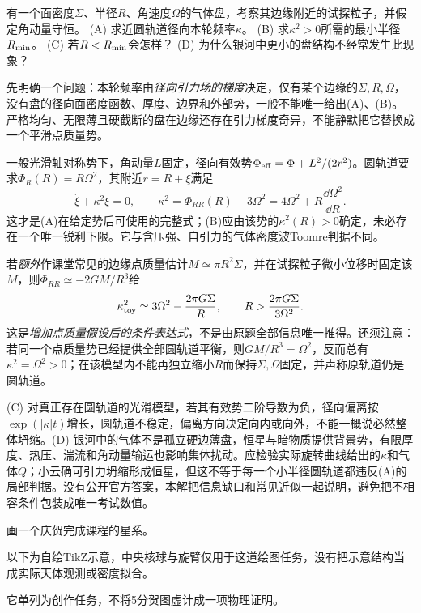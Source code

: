 \begin{exercise}
有一个面密度$\Sigma$、半径$R$、角速度$\Omega$的气体盘，考察其边缘附近的试探粒子，并假定角动量守恒。
(A) 求近圆轨道径向本轮频率$\kappa$。
(B) 求$\kappa^2>0$所需的最小半径$R_{ \rm min}$。
(C) 若$R<R_{ \rm min}$会怎样？
(D) 为什么银河中更小的盘结构不经常发生此现象？
\end{exercise}
\begin{solution}
先明确一个问题：本轮频率由\emph{径向引力场的梯度}决定，仅有某个边缘的$\Sigma,R,\Omega$，没有盘的径向面密度函数、厚度、边界和外部势，一般不能唯一给出(A)、(B)。严格均匀、无限薄且硬截断的盘在边缘还存在引力梯度奇异，不能静默把它替换成一个平滑点质量势。

一般光滑轴对称势下，角动量$L$固定，径向有效势$\Phi_{ \rm eff}=\Phi+L^2/(2r^2)$。圆轨道要求$\Phi_R(R)=R\Omega^2$，其附近$r=R+\xi$满足
\[
 \ddot\xi+\kappa^2\xi=0,\qquad
 \kappa^2=\Phi_{RR}(R)+3\Omega^2=4\Omega^2+R\frac{\dd\Omega^2}{\dd R}.
\]
这才是(A)在给定势后可使用的完整式；(B)应由该势的$\kappa^2(R)>0$确定，未必存在一个唯一锐利下限。它与含压强、自引力的气体密度波Toomre判据不同。

若\emph{额外}作课堂常见的边缘点质量估计$M\simeq\pi R^2\Sigma$，并在试探粒子微小位移时固定该$M$，则$\Phi_{RR}\simeq-2GM/R^3$给
\[
 \kappa_{ \rm toy}^2\simeq3\Omega^2-\frac{2\pi G\Sigma}{R},\qquad
 R>\frac{2\pi G\Sigma}{3\Omega^2}.
\]
这是\emph{增加点质量假设后的条件表达式}，不是由原题全部信息唯一推得。还须注意：若同一个点质量势已经提供全部圆轨道平衡，则$GM/R^3=\Omega^2$，反而总有$\kappa^2=\Omega^2>0$；在该模型内不能再独立缩小$R$而保持$\Sigma,\Omega$固定，并声称原轨道仍是圆轨道。

(C) 对真正存在圆轨道的光滑模型，若其有效势二阶导数为负，径向偏离按$\exp(|\kappa|t)$增长，圆轨道不稳定，偏离方向决定向内或向外，不能一概说必然整体坍缩。(D) 银河中的气体不是孤立硬边薄盘，恒星与暗物质提供背景势，有限厚度、热压、湍流和角动量输运也影响集体扰动。应检验实际旋转曲线给出的$\kappa$和气体$Q$；小云确可引力坍缩形成恒星，但这不等于每一个小半径圆轨道都违反(A)的局部判据。没有公开官方答案，本解把信息缺口和常见近似一起说明，避免把不相容条件包装成唯一考试数值。
\end{solution}

\begin{exercise}
画一个庆贺完成课程的星系。
\end{exercise}
\begin{solution}
以下为自绘TikZ示意，中央核球与旋臂仅用于这道绘图任务，没有把示意结构当成实际天体观测或密度拟合。
\begin{center}\end{center}
它单列为创作任务，不将5分贺图虚计成一项物理证明。
\end{solution}
